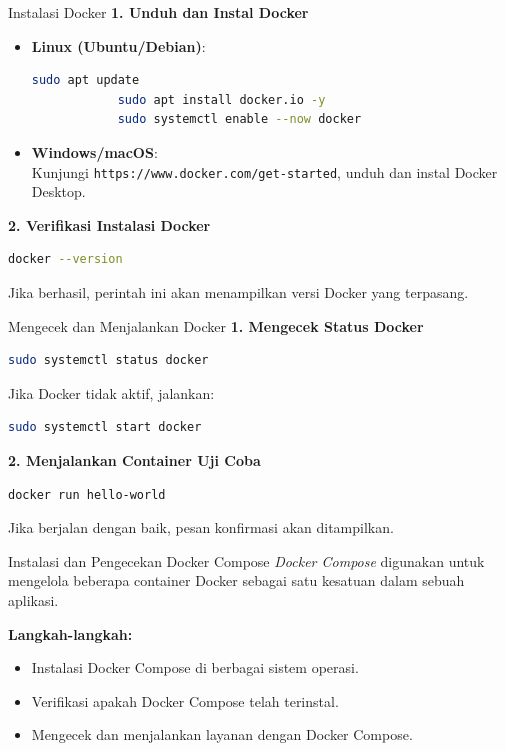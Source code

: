 \documentclass[aspectratio=169, table]{beamer}
\begin{document}
\begin{frame}[fragile]{Instalasi Docker}
	\textbf{1. Unduh dan Instal Docker} \\
	\begin{itemize}
		\item \textbf{Linux (Ubuntu/Debian)}:
		\begin{lstlisting}[language=bash]
			sudo apt update
			sudo apt install docker.io -y
			sudo systemctl enable --now docker
		\end{lstlisting}
		\item \textbf{Windows/macOS}: \\
		Kunjungi \texttt{https://www.docker.com/get-started}, unduh dan instal Docker Desktop.
	\end{itemize}
	
	\textbf{2. Verifikasi Instalasi Docker} \\
	\begin{lstlisting}[language=bash]
		docker --version
	\end{lstlisting}
	Jika berhasil, perintah ini akan menampilkan versi Docker yang terpasang.
\end{frame}

\begin{frame}[fragile]{Mengecek dan Menjalankan Docker}
	\textbf{1. Mengecek Status Docker} \\
	\begin{lstlisting}[language=bash]
		sudo systemctl status docker
	\end{lstlisting}
	Jika Docker tidak aktif, jalankan:
	\begin{lstlisting}[language=bash]
		sudo systemctl start docker
	\end{lstlisting}
	
	\textbf{2. Menjalankan Container Uji Coba} \\
	\begin{lstlisting}[language=bash]
		docker run hello-world
	\end{lstlisting}
	Jika berjalan dengan baik, pesan konfirmasi akan ditampilkan.
\end{frame}

\begin{frame}[fragile]{Instalasi dan Pengecekan Docker Compose}
	\textit{Docker Compose} digunakan untuk mengelola beberapa container Docker sebagai satu kesatuan dalam sebuah aplikasi. 
	
	\textbf{Langkah-langkah:}
	\begin{itemize}
		\item Instalasi Docker Compose di berbagai sistem operasi.
		\item Verifikasi apakah Docker Compose telah terinstal.
		\item Mengecek dan menjalankan layanan dengan Docker Compose.
	\end{itemize}
\end{frame}
\end{document}
